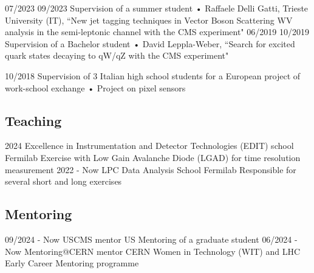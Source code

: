   \teaching
    {07/2023 \textemdash{} 09/2023}
    {Supervision of a summer student • }{Raffaele Delli Gatti, Trieste University (IT), ``New jet tagging techniques in Vector Boson Scattering WV analysis in the semi-leptonic channel with the CMS experiment"}
  \teaching
    {06/2019 \textemdash{} 10/2019}
    {Supervision of a Bachelor student • }{David Leppla-Weber, ``Search for excited quark states decaying to qW/qZ with the CMS experiment"}
      
  \teaching
    {10/2018}
    {Supervision of 3 Italian high school students for a European project of work-school exchange • }
    {Project on pixel sensors}
\subsection{Teaching}
\position
      {2024} 
      {Excellence in Instrumentation and Detector Technologies (EDIT) school}
      {Fermilab}
      {Exercise with Low Gain Avalanche Diode (LGAD) for time resolution measurement}
	\position
      {2022 - Now} 
      {LPC Data Analysis School}
      {Fermilab}
      {Responsible for several short and long exercises}
\subsection{Mentoring}
	\position
      {09/2024 - Now } 
      {USCMS mentor}
      {US}
      {Mentoring of a graduate student}
	\position
      {06/2024 - Now } 
      {Mentoring@CERN mentor}
      {CERN}
      {Women in Technology (WIT) and LHC Early Career Mentoring programme}

